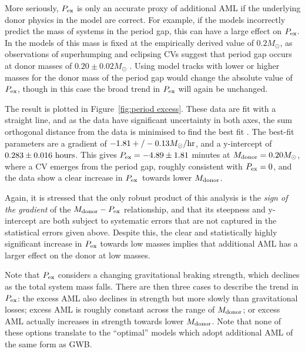 More seriously, $P_{\rm ex}$ is only an accurate proxy of additional AML if the underlying donor physics in the model are correct. For example, if the models incorrectly predict the mass of systems in the period gap, this can have a large effect on $P_{\rm ex}$. In the models of \citet{knigge11} this mass is fixed at the empirically derived value of $0.2 M_\odot$, as observations of superhumping and eclipsing CVs suggest that period gap occurs at donor masses of $0.20 \pm 0.02 M_\odot$ \citep{knigge2006}. Using model tracks with lower or higher masses for the donor mass of the period gap would change the absolute value of $P_{\rm ex}$, though in this case the broad trend in $P_{\rm ex}$ will again be unchanged.

The result is plotted in Figure~\ref{fig:period excess}. These data are fit with a straight line, and as the data have significant uncertainty in both axes, the sum orthogonal distance from the data is minimised to find the best fit \citep{hogg2010}. The best-fit parameters are a gradient of $-1.81+/-  0.13 M_\odot / {\rm hr}$, and a y-intercept of $0.283 \pm 0.016 {\rm\ hours}$. This gives $P_{\rm ex} = -4.89 \pm 1.81$ minutes at $M_{\rm donor} = 0.20M_\odot$, where a CV emerges from the period gap, roughly consistent with $P_{\rm ex}=0$, and the data show a clear increase in $P_{\rm ex}$\ towards lower $M_{\rm donor}$.

Again, it is stressed that the only robust product of this analysis is the \textit{sign of the gradient} of the $M_{\rm donor} - P_{\rm ex}$ relationship, and that its steepness and y-intercept are both subject to systematic errors that are not captured in the statistical errors given above. Despite this, the clear and statistically highly significant increase in $P_{\rm ex}$ towards low masses implies that additional AML has a larger effect on the donor at low masses.

Note that $P_{\rm ex}$ considers a changing gravitational braking strength, which declines as the total system mass falls.
There are then three cases to describe the trend in $P_{\rm ex}$: the excess AML also declines in strength but more slowly than gravitational losses; excess AML is roughly constant across the range of $M_{\rm donor}$; or excess AML actually increases in strength towards lower $M_{\rm donor}$. Note that none of these options translate to the ``optimal'' \citet{knigge11} models which adopt additional AML of the same form as GWB.


